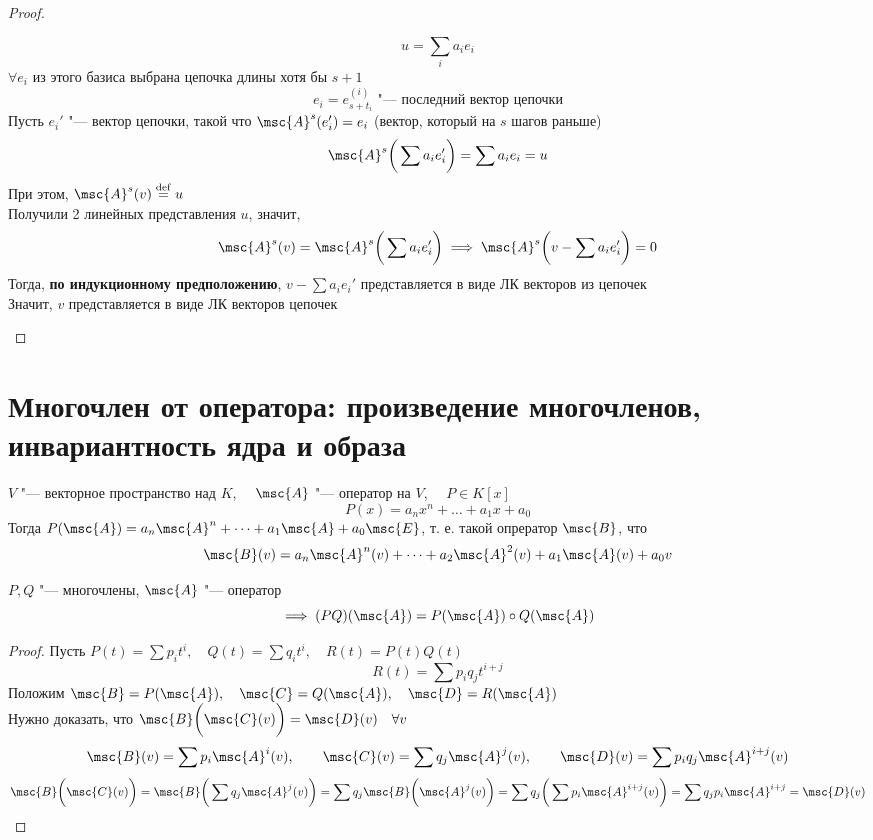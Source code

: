 \begin{proof}
\begin{itemize}
		$$ u = \sum_i a_ie_i $$
		$ \forall e_i $ из этого базиса выбрана цепочка длины хотя бы $ s + 1 $
		$$ e_i = e_{s + t_i}^{(i)} \text{ "--- последний вектор цепочки} $$
		Пусть $ e_i' $ "--- вектор цепочки, такой что $ \msc{A}^s(e_i') = e_i $ (вектор, который на $ s $ шагов раньше)
		$$ \msc{A}^s \bigg( \sum a_ie_i' \bigg) = \sum a_ie_i = u $$
		При этом, $ \msc{A}^s(v) \bydef u $ \\
		Получили 2 линейных представления $ u $, значит,
		$$ \msc{A}^s(v) = \msc{A}^s \bigg( \sum a_ie_i' \bigg) \implies \msc{A}^s \bigg( v - \sum a_ie_i' \bigg) = 0 $$
		Тогда, \textbf{по индукционному предположению}, $ v - \sum a_ie_i' $ представляется в виде ЛК векторов из цепочек \\
		Значит, $ v $ представляется в виде ЛК векторов цепочек
	\end{itemize}
\end{proof}

\section{Многочлен от оператора: произведение многочленов, инвариантность ядра и образа}

\begin{notation}
	$ V $ "--- векторное пространство над $ K $, $ \quad \msc{A} $ "--- оператор на $ V $, $ \quad P \in K[x] $
	$$ P(x) = a_nx^n + \dots + a_1x + a_0 $$
	Тогда $ P(\msc{A}) = a_n\msc{A}^n + \dots + a_1\msc{A} + a_0\msc{E} $, т. е. такой опрератор $ \msc{B} $, что
	$$ \msc{B}(v) = a_n \msc{A}^n(v) + \dots + a_2\msc{A}^2(v) + a_1\msc{A}(v) + a_0v $$
\end{notation}

\begin{lemma}
	$ P, Q $ "--- многочлены, $ \msc{A} $ "--- оператор
	$$ \implies (PQ)(\msc{A}) = P(\msc{A}) \circ Q(\msc{A}) $$
\end{lemma}

\begin{proof}
	Пусть $ P(t) = \sum p_it^i, \quad Q(t) = \sum q_it^i, \quad R(t) = P(t)Q(t) $
	$$ R(t) = \sum p_iq_jt^{i + j} $$
	Положим $ \msc{B} = P(\msc{A}), \quad \msc{C} = Q(\msc{A}), \quad \msc{D} = R(\msc{A}) $ \\
	Нужно доказать, что $ \msc{B} \bigg( \msc{C}(v) \bigg) = \msc{D}(v) \quad \forall v $
	$$ \msc{B}(v) = \sum p_i \msc{A}^i(v), \qquad \msc{C}(v) = \sum q_j\msc{A}^j(v), \qquad \msc{D}(v) = \sum p_iq_j \msc{A}^{i + j}(v) $$
	$$ \msc{B} \bigg( \msc{C}(v) \bigg) = \msc{B} \bigg( \sum q_j \msc{A}^j(v) \bigg) = \sum q_j \msc{B} \bigg( \msc{A}^j(v) \bigg) = \sum q_j \bigg( \sum p_i \msc{A}^{i + j}(v) \bigg) = \sum q_jp_i \msc{A}^{i + j} = \msc{D}(v) $$
\end{proof}

